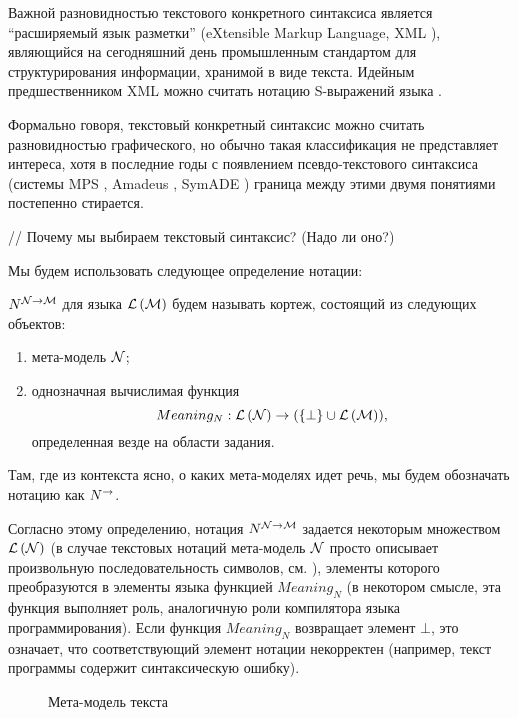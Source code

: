 Важной разновидностью текстового конкретного синтаксиса является ``расширяемый язык разметки'' (eXtensible Markup Language, XML \cite{XML}), являющийся на сегодняшний день промышленным стандартом для структурирования информации, хранимой в виде текста. Идейным предшественником XML можно считать нотацию S-выражений языка  \cite{LISP}.

Формально говоря, текстовый конкретный синтаксис можно считать разновидностью графического, но обычно такая классификация не представляет интереса, хотя в последние годы с появлением псевдо-текстового синтаксиса (системы MPS \cite{MPS}, Amadeus \cite{Amadeus}, SymADE \cite{SymADE}) граница между этими двумя понятиями постепенно стирается.

// Почему мы выбираем текстовый синтаксис? (Надо ли оно?)

Мы будем использовать следующее определение нотации:

\newcommand{\NNot}[3]{#1^{{#2} \rightarrow{} {#3}}}
\newcommand{\Not}[3]{\NNot{#1}{\MM{#2}}{\MM{#3}}}
\newcommand{\N}[2]{\Not{#1}{#1}{#2}}

\begin{Def}
 $\N{N}{M}$ для языка $\mathcal{L}\left(\mathcal{M}\right)$ будем называть кортеж, состоящий из следующих объектов:
\begin{enumerate}
\item мета-модель $\mathcal{N}$;
\item однозначная вычислимая функция $$Meaning_N : \mathcal{L}\left(\mathcal{N}\right) \rightarrow (\{\bot\} \cup \mathcal{L}\left(\mathcal{M}\right)),$$ определенная везде на области задания.
\end{enumerate}

Там, где из контекста ясно, о каких мета-моделях идет речь, мы будем обозначать нотацию как $\Not{N}{}{}$.
\end{Def}

Согласно этому определению, нотация $\N{N}{M}$ задается некоторым множеством $\mathcal{L}\left(\mathcal{N}\right)$ (в случае текстовых нотаций мета-модель $\mathcal{N}$ просто описывает произвольную последовательность символов, см. ), элементы которого преобразуются в элементы языка функцией $Meaning_N$ (в некотором смысле, эта функция выполняет роль, аналогичную роли компилятора языка программирования). Если функция $Meaning_N$ возвращает элемент $\bot$, это означает, что соответствующий элемент нотации некорректен (например, текст программы содержит синтаксическую ошибку).

\begin{figure}[htbp]
\caption{Мета-модель текста}\label{TextMM}
\end{figure}

